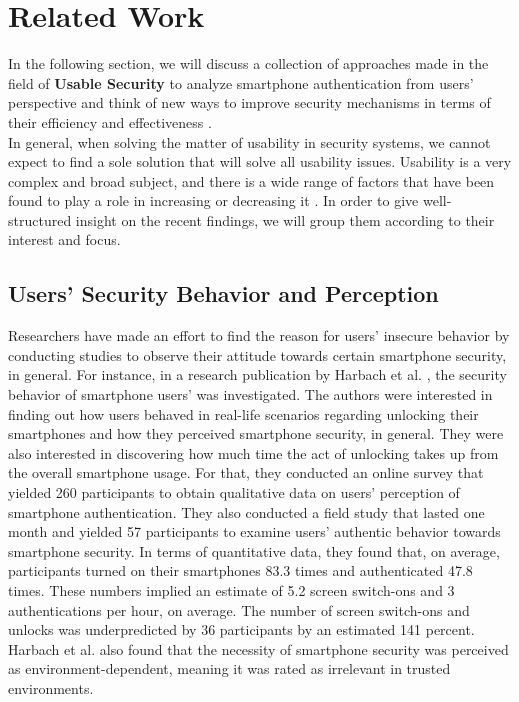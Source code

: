 \section{Related Work}

In the following section, we will discuss a collection of approaches made in the field of \textbf{Usable Security} to analyze smartphone authentication from users' perspective and think of new ways to improve security mechanisms in terms of their efficiency and effectiveness \cite{anonymous}. \\

In general, when solving the matter of usability in security systems, we cannot expect to find a sole solution that will solve all usability issues. Usability is a very complex and broad subject, and there is a wide range of factors that have been found to play a role in increasing or decreasing it \cite{anonymous,harbach,Albayram:2017:BUL:3235924.3235929, AnatomySmartphone}. In order to give well-structured insight on the recent findings, we will group them according to their interest and focus.

\subsection{Users' Security Behavior and Perception}

Researchers have made an effort to find the reason for users' insecure behavior by conducting studies to observe their attitude towards certain smartphone security, in general. For instance, in a research publication by Harbach et al. \cite{harbach}, the security behavior of smartphone users' was investigated. The authors were interested in finding out how users behaved in real-life scenarios regarding unlocking their smartphones and how they perceived smartphone security, in general. They were also interested in discovering how much time the act of unlocking takes up from the overall smartphone usage. For that, they conducted an online survey that yielded 260 participants to obtain qualitative data on users' perception of smartphone authentication. They also conducted a field study that lasted one month and yielded 57 participants to examine users' authentic behavior towards smartphone security. In terms of quantitative data, they found that, on average, participants turned on their smartphones 83.3 times and authenticated 47.8 times. These numbers implied an estimate of 5.2 screen switch-ons and 3 authentications per hour, on average. The number of screen switch-ons and unlocks was underpredicted by 36 participants by an estimated 141 percent. Harbach et al. \cite{harbach} also found that the necessity of smartphone security was perceived as environment-dependent, meaning it was rated as irrelevant in trusted environments.\\

